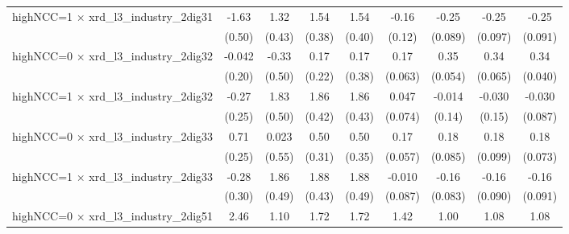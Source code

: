 {\begin{tabular}{l*{8}{c}}
\addlinespace
highNCC=1 $\times$ xrd\_l3\_industry\_2dig31&       -1.63\sym{***}&        1.32\sym{***}&        1.54\sym{***}&        1.54\sym{***}&       -0.16         &       -0.25\sym{***}&       -0.25\sym{**} &       -0.25\sym{***}\\
                    &      (0.50)         &      (0.43)         &      (0.38)         &      (0.40)         &      (0.12)         &     (0.089)         &     (0.097)         &     (0.091)         \\
\addlinespace
highNCC=0 $\times$ xrd\_l3\_industry\_2dig32&      -0.042         &       -0.33         &        0.17         &        0.17         &        0.17\sym{***}&        0.35\sym{***}&        0.34\sym{***}&        0.34\sym{***}\\
                    &      (0.20)         &      (0.50)         &      (0.22)         &      (0.38)         &     (0.063)         &     (0.054)         &     (0.065)         &     (0.040)         \\
\addlinespace
highNCC=1 $\times$ xrd\_l3\_industry\_2dig32&       -0.27         &        1.83\sym{***}&        1.86\sym{***}&        1.86\sym{***}&       0.047         &      -0.014         &      -0.030         &      -0.030         \\
                    &      (0.25)         &      (0.50)         &      (0.42)         &      (0.43)         &     (0.074)         &      (0.14)         &      (0.15)         &     (0.087)         \\
\addlinespace
highNCC=0 $\times$ xrd\_l3\_industry\_2dig33&        0.71\sym{***}&       0.023         &        0.50         &        0.50         &        0.17\sym{***}&        0.18\sym{**} &        0.18\sym{*}  &        0.18\sym{**} \\
                    &      (0.25)         &      (0.55)         &      (0.31)         &      (0.35)         &     (0.057)         &     (0.085)         &     (0.099)         &     (0.073)         \\
\addlinespace
highNCC=1 $\times$ xrd\_l3\_industry\_2dig33&       -0.28         &        1.86\sym{***}&        1.88\sym{***}&        1.88\sym{***}&      -0.010         &       -0.16\sym{**} &       -0.16\sym{*}  &       -0.16\sym{*}  \\
                    &      (0.30)         &      (0.49)         &      (0.43)         &      (0.49)         &     (0.087)         &     (0.083)         &     (0.090)         &     (0.091)         \\
\addlinespace
highNCC=0 $\times$ xrd\_l3\_industry\_2dig51&        2.46\sym{***}&        1.10\sym{*}  &        1.72\sym{***}&        1.72\sym{***}&        1.42\sym{***}&        1.00\sym{***}&        1.08\sym{***}&        1.08\sym{***}\\

\end{tabular}}
